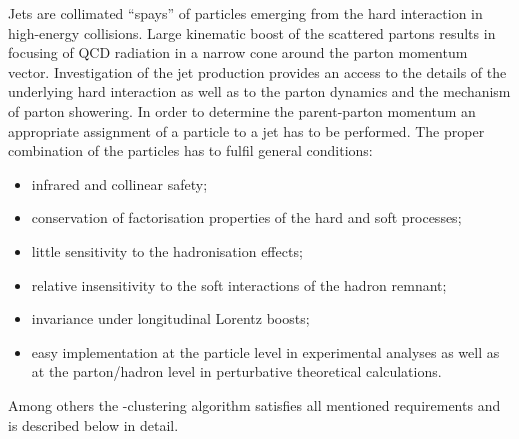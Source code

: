 Jets are collimated ``spays'' of particles emerging from the hard interaction in high-energy collisions. Large kinematic boost of the scattered partons results in focusing of QCD radiation in a narrow cone around the parton momentum vector. Investigation of  the jet production provides an access to the details of the underlying hard interaction as well as to the parton dynamics and the mechanism of parton showering. In order to determine the parent-parton momentum an appropriate assignment of a particle to a jet has to be performed. The proper combination of the particles has to fulfil general conditions:
\begin{itemize}
	\item infrared and collinear safety;
	\item conservation of factorisation properties of the hard and soft processes;
	\item little sensitivity to the hadronisation effects;
	\item relative insensitivity to the soft interactions of the hadron remnant;
	\item invariance under longitudinal Lorentz boosts;
	\item easy implementation at the particle level in experimental analyses as well as at the parton/hadron level in perturbative theoretical calculations.
\end{itemize}
Among others the \kt-clustering algorithm satisfies all mentioned requirements and is described below in detail.

